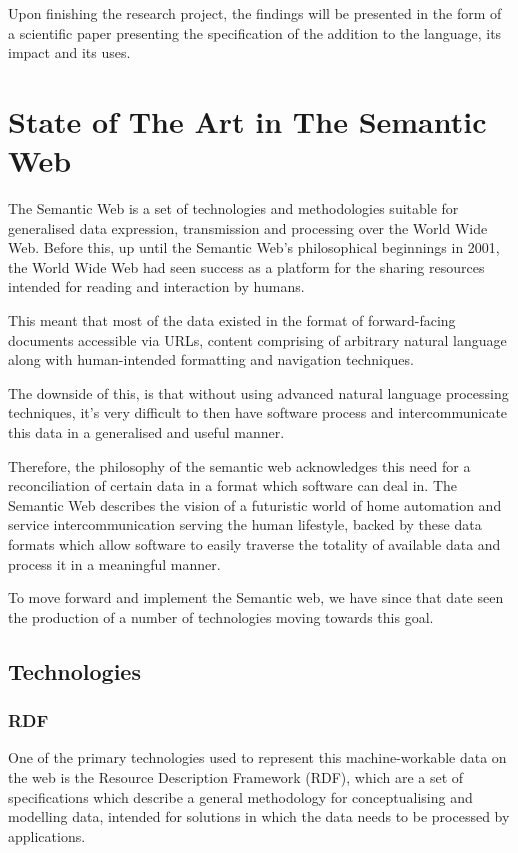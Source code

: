 \documentclass{article}
\begin{document}
Upon finishing the research project, the findings will be presented in the form
of a scientific paper presenting the specification of the addition to the
language, its impact and its uses.

\section{State of The Art in The Semantic Web}

The Semantic Web is a set of technologies and methodologies suitable for
generalised data expression, transmission and processing over the World Wide
Web. Before this, up until the Semantic Web's philosophical beginnings in
2001, the World Wide Web had seen success as a platform for the
sharing resources intended for reading and interaction by humans.

This meant that most of the data existed in the format of forward-facing 
documents accessible via URLs, content comprising of arbitrary natural language
along with human-intended formatting and navigation techniques.

The downside of this, is that without using advanced natural language 
processing techniques, it's very difficult to then have software process and
intercommunicate this data in a generalised and useful manner.

Therefore, the philosophy of the semantic web acknowledges this need for a
reconciliation of certain data in a format which software can deal in. The
Semantic Web\cite{semweb} describes the vision of a futuristic world of home
automation and service intercommunication serving the human lifestyle, backed by
these data formats which allow software to easily traverse the totality of
available data and process it in a meaningful manner. 

To move forward and implement the Semantic web, we have since that date seen the
production of a number of technologies moving towards this goal.

\subsection{Technologies}

\subsubsection{RDF}

One of the primary technologies used to represent this machine-workable data on
the web is the Resource Description Framework (RDF), which are a set of
specifications which describe a general methodology for conceptualising and
modelling data, intended for solutions in which the data needs to be processed
by applications.
\end{document}
